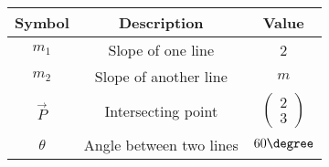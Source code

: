    \begin{tabular}{|c|c|c|}
    \hline
        \textbf{Symbol} &\textbf{Description}&\textbf{Value}  \\
        \hline
         $m_1$&Slope of one line &2\\
         \hline
         $m_2$&Slope of another line&$m$\\
         \hline
         $\vec{P}$&Intersecting point&$\begin{pmatrix}
             2\\3
         \end{pmatrix}$\\
         \hline
         $\theta$&Angle between two lines&$60\degree$\\
         \hline
    \end{tabular}

